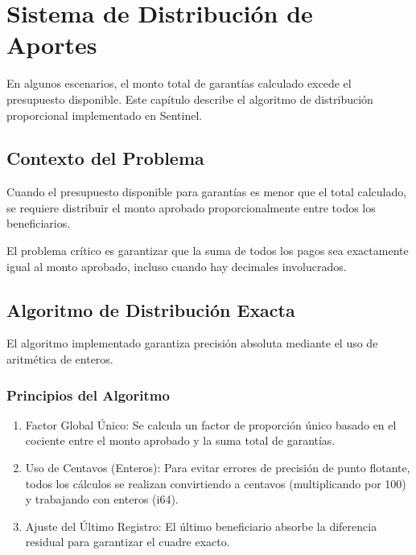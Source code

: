 \chapter{Sistema de Distribución de Aportes}

\bigskip

En algunos escenarios, el monto total de garantías calculado excede el presupuesto disponible. Este capítulo describe el algoritmo de distribución proporcional implementado en Sentinel.

\bigskip

\section{Contexto del Problema}

Cuando el presupuesto disponible para garantías es menor que el total calculado, se requiere distribuir el monto aprobado proporcionalmente entre todos los beneficiarios.

\bigskip

El problema crítico es garantizar que la suma de todos los pagos sea exactamente igual al monto aprobado, incluso cuando hay decimales involucrados.

\bigskip

\section{Algoritmo de Distribución Exacta}

El algoritmo implementado garantiza precisión absoluta mediante el uso de aritmética de enteros.

\bigskip

\subsection{Principios del Algoritmo}

\begin{enumerate}
    \item Factor Global Único: Se calcula un factor de proporción único basado en el cociente entre el monto aprobado y la suma total de garantías.
    \item Uso de Centavos (Enteros): Para evitar errores de precisión de punto flotante, todos los cálculos se realizan convirtiendo a centavos (multiplicando por 100) y trabajando con enteros (i64).
    \item Ajuste del Último Registro: El último beneficiario absorbe la diferencia residual para garantizar el cuadre exacto.
\end{enumerate}

